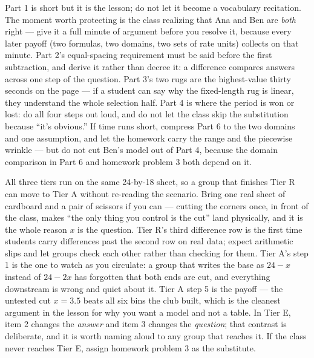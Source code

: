 \documentclass[10pt]{article}
\begin{document}
\begin{teachernote}
Part 1 is short but it is the lesson; do not let it become a vocabulary
recitation. The moment worth protecting is the class realizing that Ana and Ben
are \textit{both} right --- give it a full minute of argument before you
resolve it, because every later payoff (two formulas, two domains, two sets of
rate units) collects on that minute. Part 2's equal-spacing requirement must be
said before the first subtraction, and derive it rather than decree it: a
difference compares answers across one step of the question. Part 3's two rugs
are the highest-value thirty seconds on the page --- if a student can say why
the fixed-length rug is linear, they understand the whole selection half. Part 4
is where the period is won or lost: do all four steps out loud, and do not let
the class skip the substitution because ``it's obvious.'' If time runs short,
compress Part 6 to the two domains and one assumption, and let the homework
carry the range and the piecewise wrinkle --- but do not cut Ben's model out of
Part 4, because the domain comparison in Part 6 and homework problem 3 both
depend on it.
\end{teachernote}

\begin{teachernote}
All three tiers run on the same 24-by-18 sheet, so a group that finishes Tier R
can move to Tier A without re-reading the scenario. Bring one real sheet of
cardboard and a pair of scissors if you can --- cutting the corners once, in
front of the class, makes ``the only thing you control is the cut'' land
physically, and it is the whole reason $x$ is the question. Tier R's third
difference row is the first time students carry differences past the second row
on real data; expect arithmetic slips and let groups check each other rather
than checking for them. Tier A's step 1 is the one to watch as you circulate: a
group that writes the base as $24 - x$ instead of $24 - 2x$ has forgotten that
both ends are cut, and everything downstream is wrong and quiet about it. Tier
A step 5 is the payoff --- the untested cut $x = 3.5$ beats all six bins the
club built, which is the cleanest argument in the lesson for why you want a
model and not a table. In Tier E, item 2 changes the \textit{answer} and item 3
changes the \textit{question}; that contrast is deliberate, and it is worth
naming aloud to any group that reaches it. If the class never reaches Tier E,
assign homework problem 3 as the substitute.
\end{teachernote}
\end{document}
